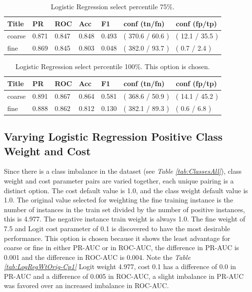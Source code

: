 \documentclass[ms]{nuthesis}
\begin{document}
\FloatBarrier
\begin{table}[H]
\centering
\caption{Logistic Regression select percentile 75\%.}
\label{tab:LogRegSel75}
\begin{tabular}{|l||l||l||l||l||l||l|}\toprule
Title & PR & ROC & Acc & F1 & conf (tn/fn) & conf (fp/tp) \\ \midrule
coarse & 0.871 & 0.847 & 0.848 & 0.493 & ( 370.6 / 60.6 ) & ( 12.1 / 35.5 ) \\
fine & 0.869 & 0.845 & 0.803 & 0.048 & ( 382.0 / 93.7 ) & ( 0.7 / 2.4 ) \\ \bottomrule
\end{tabular}
\end{table}
\FloatBarrier


\FloatBarrier
\begin{table}[H]
\centering
\caption{Logistic Regression select percentile 100\%. This option is chosen.}
\label{tab:LogRegMinMax}
\begin{tabular}{|l||l||l||l||l||l||l|}\toprule
Title & PR & ROC & Acc & F1 & conf (tn/fn) & conf (fp/tp) \\ \midrule
coarse & 0.891 & 0.867 & 0.864 & 0.581 & ( 368.6 / 50.9 ) & ( 14.1 / 45.2 ) \\
fine & 0.888 & 0.862 & 0.812 & 0.130 & ( 382.1 / 89.3 ) & ( 0.6 / 6.8 ) \\ \bottomrule
\end{tabular}
\end{table}
\FloatBarrier


\subsection{Varying Logistic Regression Positive Class Weight and Cost}
\label{sect:logitClsWeight}
\par Since there is a class imbalance in the dataset (see \textit{Table \ref{tab:ClassesAll}}),
class weight and cost parameter pairs are varied together, each unique pairing is a distinct option.
The cost default value is 1.0, and the class weight default value is 1.0. The original value selected for weighting
the fine training instance is the number of instances in the train set divided by the number of positive
instances, this is 4.977. The negative instance train weight is always 1.0. The fine weight of 7.5
and Logit cost parameter of 0.1 is discovered to have the most desirable performance. This option is chosen
because it shows the least advantage for coarse
or fine in either PR-AUC or in ROC-AUC, the difference in PR-AUC is 0.001 and the difference in
ROC-AUC is 0.004. Note the \textit{Table \ref{tab:LogRegWtOrig-Cp1}}
Logit weight 4.977, cost 0.1 has a difference of 0.0 in PR-AUC and a difference of 0.005 in ROC-AUC, a slight
imbalance in PR-AUC was favored over an increased imbalance in ROC-AUC.
\end{document}
